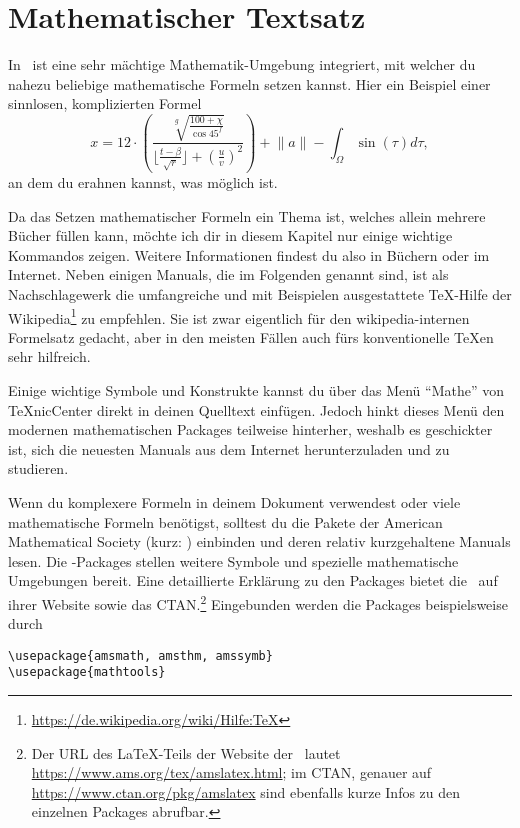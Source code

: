 %
%
\chapter{Mathematischer Textsatz}

In \DMLLaTeX \ ist eine sehr mächtige Mathematik-Umgebung integriert, mit welcher du nahezu beliebige mathematische Formeln setzen kannst. Hier ein Beispiel einer sinnlosen, komplizierten Formel
\begin{equation}
	x = 12 \cdot \left( \frac{
		\sqrt[g]{ \frac{ 100 + \chi }{ \cos 45^{f} } }
	}{
		\lfloor \frac{ t - \beta }{ \sqrt{ r } } \rfloor
		+ \left( \frac uv \right)^2
	} \right) + \lVert a\rVert - \int_\Omega \sin(\tau) d\tau,
\end{equation}
an dem du erahnen kannst, was möglich ist.

Da das Setzen mathematischer Formeln ein Thema ist, welches allein mehrere Bücher füllen kann, möchte ich dir in diesem Kapitel nur einige wichtige Kommandos zeigen. Weitere Informationen findest du also in Büchern oder im Internet. Neben einigen Manuals, die im Folgenden genannt sind, ist als Nachschlagewerk die umfangreiche und mit Beispielen ausgestattete \TeX-Hilfe der Wikipedia\footnote{\href{https://de.wikipedia.org/wiki/Hilfe:TeX}{https://de.wikipedia.org/wiki/Hilfe:TeX}} zu empfehlen. Sie ist zwar eigentlich für den wikipedia-internen Formelsatz gedacht, aber in den meisten Fällen auch fürs konventionelle \TeX{}en sehr hilfreich.

Einige wichtige Symbole und Konstrukte kannst du über das Menü \enquote{Mathe} von TeXnicCenter direkt in deinen Quelltext einfügen. Jedoch hinkt dieses Menü den modernen mathematischen Packages teilweise hinterher, weshalb es geschickter ist, sich die neuesten Manuals aus dem Internet herunterzuladen und zu studieren.

Wenn du komplexere Formeln in deinem Dokument verwendest oder viele mathematische Formeln benötigst, solltest du die Pakete der American Mathematical Society (kurz: \AmS) einbinden und deren relativ kurzgehaltene Manuals lesen. Die \AmSmath-Packages stellen weitere Symbole und spezielle mathematische Umgebungen bereit. Eine detaillierte Erklärung zu den Packages bietet die \AmS\ auf ihrer Website sowie das CTAN.\footnote{Der URL des {\rmfamily\LaTeX}-Teils der Website der \AmS\ lautet \href{https://www.ams.org/tex/amslatex.html}{https://www.ams.org/tex/amslatex.html}; im CTAN, genauer auf \href{https://www.ctan.org/pkg/amslatex}{https://www.ctan.org/pkg/amslatex} sind ebenfalls kurze Infos zu den einzelnen Packages abrufbar.} Eingebunden werden die Packages beispielsweise durch
\begin{lstlisting}
\usepackage{amsmath, amsthm, amssymb}
\usepackage{mathtools}
\end{lstlisting}

